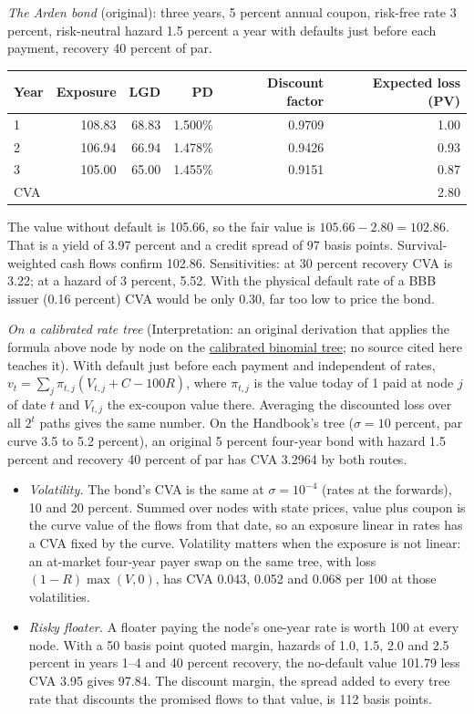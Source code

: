 \begin{qfmethod}
\emph{The Arden bond} (original): three years, 5 percent annual coupon, risk-free rate 3 percent, risk-neutral hazard 1.5 percent a year with defaults just before each payment, recovery 40 percent of par.
\begin{center}\small
\begin{tabular}{@{}lrrrrr@{}}
\toprule
Year & Exposure & LGD & PD & Discount factor & Expected loss (PV) \\
\midrule
1 & 108.83 & 68.83 & 1.500\% & 0.9709 & 1.00 \\
2 & 106.94 & 66.94 & 1.478\% & 0.9426 & 0.93 \\
3 & 105.00 & 65.00 & 1.455\% & 0.9151 & 0.87 \\
\midrule
CVA &&&&& 2.80 \\
\bottomrule
\end{tabular}
\end{center}
The value without default is 105.66, so the fair value is $105.66-2.80=102.86$. That is a yield of 3.97 percent and a credit spread of 97 basis points. Survival-weighted cash flows confirm 102.86. Sensitivities: at 30 percent recovery CVA is 3.22; at a hazard of 3 percent, 5.52. With the physical default rate of a BBB issuer (0.16 percent) CVA would be only 0.30, far too low to price the bond.

\emph{On a calibrated rate tree} (Interpretation: an original derivation that applies the formula above node by node on the \hyperref[meth:binomial-rate-tree-calibration]{calibrated binomial tree}; no source cited here teaches it). With default just before each payment and independent of rates, $v_t=\sum_j\pi_{t,j}(V_{t,j}+C-100R)$, where $\pi_{t,j}$ is the value today of 1 paid at node $j$ of date $t$ and $V_{t,j}$ the ex-coupon value there. Averaging the discounted loss over all $2^t$ paths gives the same number. On the Handbook's tree ($\sigma=10$ percent, par curve 3.5 to 5.2 percent), an original 5 percent four-year bond with hazard 1.5 percent and recovery 40 percent of par has CVA 3.2964 by both routes.
\begin{itemize}
\item \emph{Volatility.} The bond's CVA is the same at $\sigma=10^{-4}$ (rates at the forwards), 10 and 20 percent. Summed over nodes with state prices, value plus coupon is the curve value of the flows from that date, so an exposure linear in rates has a CVA fixed by the curve. Volatility matters when the exposure is not linear: an at-market four-year payer swap on the same tree, with loss $(1-R)\max(V,0)$, has CVA 0.043, 0.052 and 0.068 per 100 at those volatilities.
\item \emph{Risky floater.} A floater paying the node's one-year rate is worth 100 at every node. With a 50 basis point quoted margin, hazards of 1.0, 1.5, 2.0 and 2.5 percent in years 1--4 and 40 percent recovery, the no-default value 101.79 less CVA 3.95 gives 97.84. The discount margin, the spread added to every tree rate that discounts the promised flows to that value, is 112 basis points.
\end{itemize}


\end{qfmethod}
